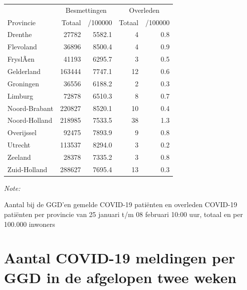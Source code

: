 \documentclass[
  english,
  man,floatsintext]{apa6}
\begin{document}
\begin{table}
\centering
\begin{threeparttable}
\begin{tabular}{lrrrr}
\toprule
\multicolumn{1}{c}{ } & \multicolumn{2}{c}{Besmettingen} & \multicolumn{2}{c}{Overleden} \\
\cmidrule(l{3pt}r{3pt}){2-3} \cmidrule(l{3pt}r{3pt}){4-5}
Provincie & Totaal & /100000 & Totaal & /100000\\
\midrule
Drenthe & 27782 & 5582.1 & 4 & 0.8\\
Flevoland & 36896 & 8500.4 & 4 & 0.9\\
FryslÃ¢n & 41193 & 6295.7 & 3 & 0.5\\
Gelderland & 163444 & 7747.1 & 12 & 0.6\\
Groningen & 36556 & 6188.2 & 2 & 0.3\\
Limburg & 72878 & 6510.3 & 8 & 0.7\\
Noord-Brabant & 220827 & 8520.1 & 10 & 0.4\\
Noord-Holland & 218985 & 7533.5 & 38 & 1.3\\
Overijssel & 92475 & 7893.9 & 9 & 0.8\\
Utrecht & 113537 & 8294.0 & 3 & 0.2\\
Zeeland & 28378 & 7335.2 & 3 & 0.8\\
Zuid-Holland & 288627 & 7695.4 & 13 & 0.3\\
\bottomrule
\end{tabular}
\begin{tablenotes}
\item \textit{Note: } 
\item Aantal bij de GGD’en gemelde COVID-19 patiënten en overleden COVID-19 patiënten per provincie van 25 januari t/m 08 februari 10:00 uur, totaal en per 100.000 inwoners
\end{tablenotes}
\end{threeparttable}
\end{table}

\newpage

\hypertarget{aantal-covid-19-meldingen-per-ggd-in-de-afgelopen-twee-weken}{%
\section{Aantal COVID-19 meldingen per GGD in de afgelopen twee weken}\label{aantal-covid-19-meldingen-per-ggd-in-de-afgelopen-twee-weken}}
\end{document}
